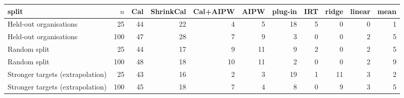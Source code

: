 \begin{tabular}{lrrrrrrrrrr}
\toprule
split & $n$ & Cal & ShrinkCal & Cal+AIPW & AIPW & plug-in & IRT & ridge & linear & mean \\
\midrule
Held-out organisations & 25 & 44 & 22 & 4 & 5 & 18 & 5 & 0 & 0 & 1 \\
Held-out organisations & 100 & 47 & 28 & 7 & 9 & 3 & 0 & 0 & 2 & 5 \\
Random split & 25 & 44 & 17 & 9 & 11 & 9 & 2 & 0 & 2 & 5 \\
Random split & 100 & 48 & 18 & 10 & 11 & 2 & 0 & 0 & 2 & 9 \\
Stronger targets (extrapolation) & 25 & 43 & 16 & 2 & 3 & 19 & 1 & 11 & 3 & 2 \\
Stronger targets (extrapolation) & 100 & 45 & 18 & 7 & 4 & 8 & 0 & 9 & 3 & 5 \\
\bottomrule
\end{tabular}
